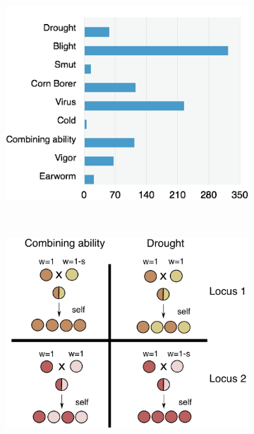 \documentclass[12pt]{article}
\begin{document}
\begin{figure}[t]
        \begin{subfigure}[b]{0.5\textwidth}
                \includegraphics[width=\textwidth]{disease.png}
                \caption{}
                \label{fig:words}
        \end{subfigure}%
        ~ %
        \begin{subfigure}[b]{0.5\textwidth}
                \includegraphics[width=\textwidth]{divergent.png}
                \caption{}
                \label{fig:div}
        \end{subfigure}


\end{figure}
\end{document}
